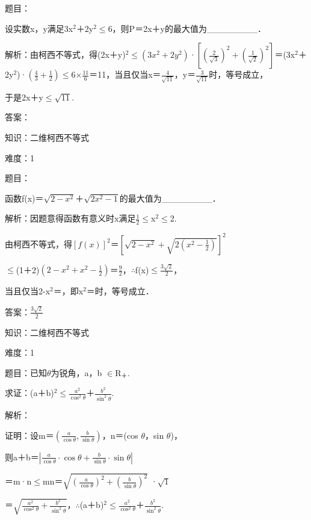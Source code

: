 \documentclass{article} %
\begin{document}
 题目：

 设实数x，y满足3x${}^{2}$＋2y${}^{2}$$\mathrm{\le}$6，则P＝2x＋y的最大值为\_\_\_\_\_\_\_\_．

 解析：由柯西不等式，得(2x＋y)${}^{2}$$\mathrm{\le}$$(3x^2+2y^2)$·$[(\frac{2}{\sqrt{3}})^2+(\frac{1}{\sqrt{2}})^2]$＝(3x${}^{2}$＋2y${}^{2}$)·$(\frac{4}{3}+\frac{1}{2})$$\mathrm{\le}$6$\mathrm{\times}$$\frac{11}{6}$＝11，当且仅当x＝$\frac{4}{\sqrt{11}}$，y＝$\frac{3}{\sqrt{11}}$时，等号成立，

于是2x＋y$\mathrm{\le}\sqrt{11}$.

 答案：

 

 知识：二维柯西不等式

 难度：1

 题目：

 函数f(x)＝$\sqrt{2-x^2}$＋$\sqrt{2x^2-1}$的最大值为\_\_\_\_\_\_\_\_．

 解析：因题意得函数有意义时x满足$\frac{1}{2}\mathrm{\le}$x${}^{2}$$\mathrm{\le}$2.

由柯西不等式，得$[f(x)]^2$＝$[\sqrt{2-x^2}+\sqrt{2(x^2-\frac{1}{2})}]^2$

$\mathrm{\le}$(1＋2)$(2-x^2+x^2-\frac{1}{2})$＝$\frac{9}{2}$，$\mathrm{\therefore}$f(x)$\mathrm{\le}\frac{3\sqrt{2}}{2}$，

当且仅当2-x${}^{2}$＝，即x${}^{2}$＝时，等号成立．

 答案：$\frac{3\sqrt{2}}{2}$

 

 知识：二维柯西不等式

 难度：1

 题目：已知$\theta$为锐角，a，b $\mathrm{\in}$R${}_{\textrm{＋}}$.

 求证：(a＋b)${}^{2}$$\mathrm{\le}$$\frac{a^2}{\cos^2\theta}$＋$\frac{b^2}{\sin^2\theta}$.

 解析：

 证明：设m＝$(\frac{a}{\cos\theta},\frac{b}{\sin\theta})$，n＝(cos $\theta$，sin $\theta$)，

则{\textbar}a＋b{\textbar}＝$|\frac{a}{\cos\theta}\cdot\cos\theta+\frac{b}{\sin\theta}\cdot\sin\theta|$

＝{\textbar}m·n{\textbar}$\mathrm{\le}${\textbar}m{\textbar}{\textbar}n{\textbar}＝$\sqrt{(\frac{a}{\cos\theta})^2+(\frac{b}{\sin\theta})^2}$ ·$\sqrt{1}$

＝$\sqrt{\frac{a^2}{\cos^2\theta}+\frac{b^2}{\sin^2\theta}}$，$\mathrm{\therefore}$(a＋b)${}^{2}$$\mathrm{\le}$$\frac{a^2}{\cos^2\theta}$＋$\frac{b^2}{\sin^2\theta}$.
\end{document}
